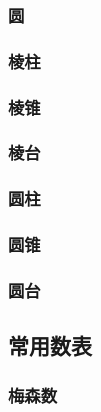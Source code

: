 \documentclass[a4paper]{article}
\begin{document}
\subsubsection{圆}

\subsubsection{棱柱}

\subsubsection{棱锥}

\subsubsection{棱台}

\subsubsection{圆柱}

\subsubsection{圆锥}

\subsubsection{圆台}

\subsection{常用数表}

\subsubsection{梅森数}
\end{document}
